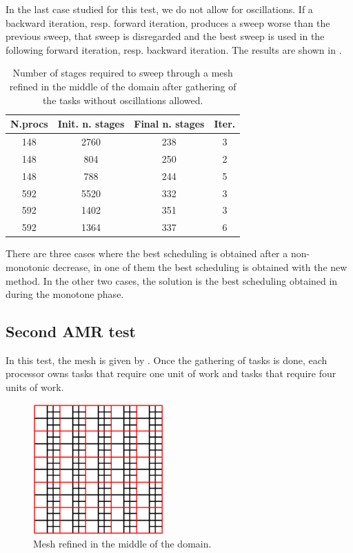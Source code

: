 \documentclass[letterpaper]{article}
\renewcommand{\(}{\left(}
\renewcommand{\)}{\right)}
\renewcommand{\[}{\left[}
\renewcommand{\]}{\right]}
\begin{document}
In the last case studied for this test, we do not allow for oscillations. If a
backward iteration, resp. forward iteration, produces a sweep worse than the
previous sweep, that sweep is disregarded and the best sweep is used in the
following forward iteration, resp. backward iteration. The results are shown in 
.
\begin{table}[H]
  \begin{center}
    \begin{tabular}{|c|c|c|c|}
      \hline
      N.procs & Init. n. stages & Final n. stages & Iter. \\
      \hline
      148 & 2760 & 238 & 3 \\
      148 & 804  & 250 & 2 \\
      148 & 788  & 244 & 5 \\
      592 & 5520 & 332 & 3 \\
      592 & 1402 & 351 & 3 \\
      592 & 1364 & 337 & 6 \\
      \hline
    \end{tabular}
    \caption{Number of stages required to sweep through a mesh refined in the
      middle of the domain after gathering of the tasks without oscillations
    allowed.}
    \label{amr_3}
  \end{center}
\end{table}
There are three cases where the best scheduling is obtained after a
non-monotonic decrease, in one of them the best scheduling is obtained with the
new method. In the other two cases, the solution is the best scheduling obtained
in during the monotone phase.


\subsection{Second AMR test}
In this test, the mesh is given by . Once the gathering of tasks is
done, each processor owns tasks that require one unit of work and tasks that
require four units of work.
\begin{figure}[H]
  \centering
  \includegraphics[width=5cm]{mesh_2}
  \caption{Mesh refined in the middle of the domain.}
  \label{mesh_2}
\end{figure}
\end{document}
